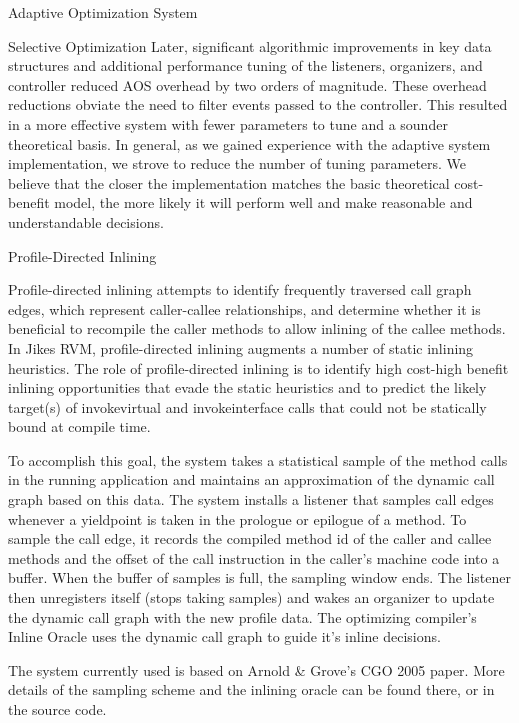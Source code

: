 \begin{chapter}{Adaptive Optimization System}
\begin{paragraph}{Selective Optimization}
Later, significant algorithmic improvements in key data structures and additional performance tuning of the listeners, organizers, and
controller reduced AOS overhead by two orders of magnitude.  These overhead reductions obviate the need to filter events passed
to the controller.  This resulted in a more effective system with fewer parameters to tune and a sounder theoretical basis.  In general, as we gained experience with the adaptive system implementation, we strove to reduce the number of tuning  parameters.  We believe that the closer the implementation matches the basic theoretical cost-benefit model, the more likely it will perform well and make reasonable and understandable decisions.

\end{paragraph}

\begin{paragraph}{Profile-Directed Inlining}

Profile-directed inlining attempts to identify frequently traversed call graph edges, which represent caller-callee relationships, and determine whether it is beneficial to recompile the caller methods
to allow inlining of the callee methods. In Jikes RVM, profile-directed inlining augments a number of static
inlining heuristics. The role of profile-directed inlining is to identify high cost-high benefit inlining opportunities that evade the static heuristics and to predict the likely target(s) of invokevirtual and invokeinterface calls that could not be statically bound at compile time.

To accomplish this goal, the system takes a statistical sample of the method calls in the running application and maintains an approximation of the dynamic call graph based on this data. The system installs a listener that samples call edges whenever a yieldpoint is taken in the prologue or epilogue of a method. To sample the call edge, it records the compiled method id of the caller and callee methods and the offset of the call instruction in the caller's machine code into a buffer. When the buffer of samples is full, the sampling window ends.
The listener then unregisters itself (stops taking samples) and wakes an organizer to update the dynamic call graph with the new profile data. The optimizing compiler's Inline Oracle uses the dynamic call graph to guide it's inline decisions.

The system currently used is based on Arnold \& Grove's CGO 2005 paper. More details of the sampling scheme and the inlining oracle can be found there, or in the source code.

\end{paragraph}













\end{chapter}
